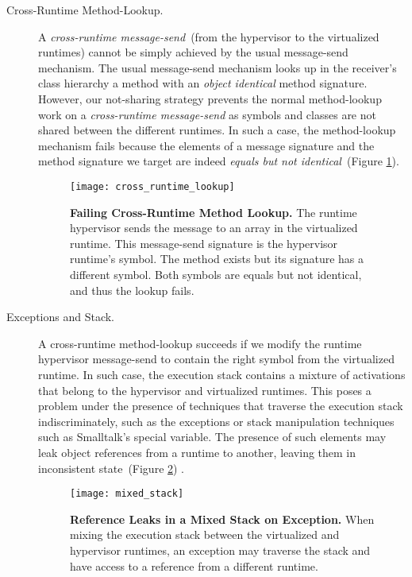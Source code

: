 \begin{description}

\item[Cross-Runtime Method-Lookup.]A \emph{cross-runtime message-send}~(from the hypervisor to the virtualized runtimes) cannot be simply achieved by the usual message-send mechanism. The usual message-send mechanism looks up in the receiver's class hierarchy a method with an \emph{object identical} method signature. However, our not-sharing strategy prevents the normal method-lookup work on a \emph{cross-runtime message-send} as symbols and classes are not shared between the different runtimes. In such a case, the method-lookup mechanism fails because the elements of a message signature and the method signature we target are indeed \emph{equals but not identical}~(Figure \ref{fig:cross_runtime_lookup}).

\begin{figure}[ht]
\center
\texttt{[image: cross\_runtime\_lookup]}
\caption{\textbf{Failing Cross-Runtime Method Lookup.} The runtime hypervisor sends the  message to an array in the virtualized runtime. This message-send signature is the hypervisor runtime's  symbol. The  method exists but its signature has a different  symbol. Both symbols are equals but not identical, and thus the lookup fails.\label{fig:cross_runtime_lookup}}
\end{figure}

\item[Exceptions and Stack.] A cross-runtime method-lookup succeeds if we modify the runtime hypervisor message-send to contain the right symbol from the virtualized runtime. In such case, the execution stack contains a mixture of activations that belong to the hypervisor and virtualized runtimes. This poses a problem under the presence of techniques that traverse the execution stack indiscriminately, such as the exceptions or stack manipulation techniques such as Smalltalk's  special variable. The presence of such elements may leak object references from a runtime to another, leaving them in inconsistent state~(Figure \ref{fig:mixed_stack}) .

\begin{figure}[ht]
\center
\texttt{[image: mixed\_stack]}
\caption{\textbf{Reference Leaks in a Mixed Stack on Exception.} When mixing the execution stack between the virtualized and hypervisor runtimes, an exception may traverse the stack and have access to a reference from a different runtime.\label{fig:mixed_stack}}
\end{figure}

\end{description}

